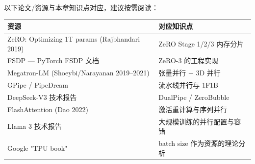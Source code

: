 \documentclass[a4paper]{article}
\begin{document}
以下论文/资源与本章知识点对应，建议按需阅读：

\begin{tabular}{p{7cm}p{6cm}}
\toprule
\textbf{资源} & \textbf{对应知识点} \\
\midrule
ZeRO: Optimizing 1T params (Rajbhandari 2019) & ZeRO Stage 1/2/3 内存分片 \\
FSDP — PyTorch FSDP 文档 & ZeRO-3 的工程实现 \\
Megatron-LM (Shoeybi/Narayanan 2019--2021) & 张量并行 + 3D 并行 \\
GPipe / PipeDream & 流水线并行与 1F1B \\
DeepSeek-V3 技术报告 & DualPipe / ZeroBubble \\
FlashAttention (Dao 2022) & 激活重计算与序列并行 \\
Llama 3 技术报告 & 大规模训练的并行配置与容错 \\
Google "TPU book" & batch size 作为资源的理论分析 \\
\bottomrule
\end{tabular}

\end{document}
